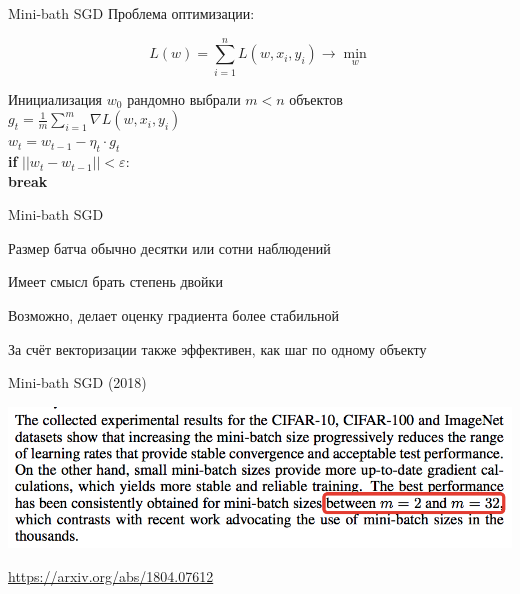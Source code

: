 \documentclass[notes,12pt, aspectratio=169]{beamer}
\newcommand{\pgr}[1]{{\color{green} \textbf{#1}}}
\newenvironment{wideitemize}{\itemize\addtolength{\itemsep}{10pt}}{\enditemize}
\begin{document}
\begin{frame}[fragile]{Mini-bath SGD}
	Проблема оптимизации: 
	
	\[   
	L(w) = \sum_{i=1}^n L(w, x_i, y_i) \to \min_{w}
	\]
	
	Инициализация $w_0$ 
	\pgr{\hspace{15pt}} рандомно выбрали $m < n$ объектов \\
	\pgr{\hspace{15pt}} $g_t =\frac{1}{m}\sum_{i=1}^m  \nabla L(w, x_i, y_i)$ \\
	\pgr{\hspace{15pt}} $w_t = w _{t-1} - \eta_t \cdot g_t   $ \\
	\pgr{\hspace{15pt} if} $||w_t - w_{t-1}|| < \varepsilon:$ \\
	\pgr{\hspace{30pt} break}
\end{frame}


\begin{frame}{Mini-bath SGD}
	\begin{wideitemize}
		\item Размер батча обычно десятки или сотни наблюдений
	
		\item Имеет смысл брать степень двойки
		
		\item Возможно, делает оценку градиента более стабильной 
		
		\item За счёт векторизации также эффективен, как шаг по одному объекту 
	\end{wideitemize}
\end{frame}



\begin{frame}{Mini-bath SGD (2018)}
\begin{center}
	\includegraphics[width=0.95\paperwidth]{mini_batch.png}
\end{center}
\vfill %
\footnotesize 
\color{blue} \url{https://arxiv.org/abs/1804.07612}
\end{frame}
\end{document}
